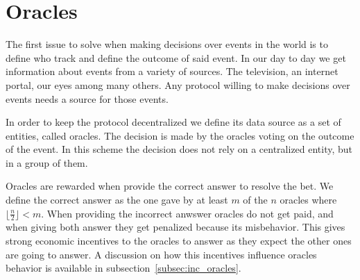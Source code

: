 \section{Oracles}

The first issue to solve when making decisions over events in the world is to
  define who track and define the outcome of said event.
In our day to day we get information about events from a variety of sources. The
  television, an internet portal, our eyes among many others. Any protocol
  willing to make decisions over events needs a source for those events.

In order to keep the protocol decentralized we define its data source as a set
  of entities, called oracles. The decision is made by the oracles voting on
  the outcome of the event. In this scheme the decision does not rely on a
  centralized entity, but in a group of them.

Oracles are rewarded when provide the correct answer to resolve the bet.
We define the correct answer as the one gave by at least $m$ of the $n$ oracles
  where $\lfloor \frac{n}{2} \rfloor < m$.
When providing the incorrect anwswer oracles do not get paid, and when giving
  both answer they get penalized because its misbehavior. This gives strong
  economic incentives to the oracles to answer as they expect the other ones
  are going to answer.
A discussion on how this incentives influence oracles behavior is available
  in subsection~\ref{subsec:inc_oracles}.
